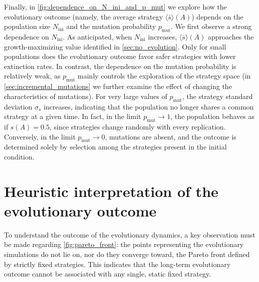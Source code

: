 \documentclass[aps,pre,reprint,10pt,superscriptaddress]{revtex4-2}
\begin{document}
Finally, in \cref{fig:dependence_on_N_ini_and_p_mut} we explore how the evolutionary outcome (namely, the average strategy $\langle\bar{s}\rangle(A)$) depends on the population size $N_\text{ini}$ and the mutation probability $p_\text{mut}$. We first observe a strong dependence on $N_\text{ini}$. As anticipated, when $N_\text{ini}$ increases, $\langle\bar{s}\rangle(A)$ approaches the growth-maximizing value identified in \cref{sec:no_evolution}. Only for small populations does the evolutionary outcome favor safer strategies with lower extinction rates. In contrast, the dependence on the mutation probability is relatively weak, as $p_\text{mut}$ mainly controls the exploration of the strategy space (in \cref{sec:incremental_mutations} we further examine the effect of changing the characteristics of mutations). For very large values of $p_\text{mut}$, the strategy standard deviation $\sigma_s$ increases, indicating that the population no longer shares a common strategy at a given time. In fact, in the limit $p_\text{mut} \to 1$, the population behaves as if $s(A) = 0.5$, since strategies change randomly with every replication. Conversely, in the limit $p_\text{mut} \to 0$, mutations are absent, and the outcome is determined solely by selection among the strategies present in the initial condition.

\section{Heuristic interpretation of the evolutionary outcome} \label{sec:heuristic_interpretation}

To understand the outcome of the evolutionary dynamics, a key observation must be made regarding \cref{fig:pareto_front}: the points representing the evolutionary simulations do not lie on, nor do they converge toward, the Pareto front defined by strictly fixed strategies. This indicates that the long-term evolutionary outcome cannot be associated with any single, static fixed strategy.
\end{document}
